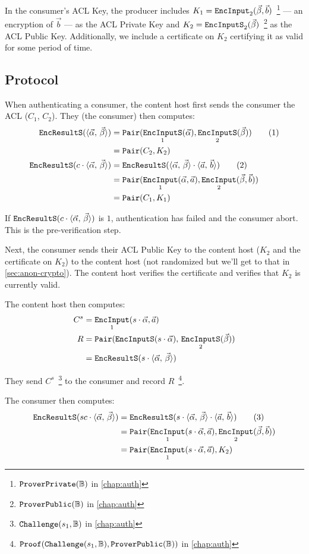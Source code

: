 \documentclass[pdftex,12pt,a4papaer,twoside,notitlepage]{report}
\newcommand{\iprod}[2]{\langle #1,\,#2\rangle}
\DeclareMathOperator{\ein}{\mathtt{EncInput}}
\DeclareMathOperator{\eins}{\mathtt{EncInputS}}
\DeclareMathOperator{\eouts}{\mathtt{EncResultS}}
\DeclareMathOperator{\pair}{\mathtt{Pair}}
\DeclareMathOperator{\Proof}{\mathtt{Proof}}
\begin{document}
In the consumer's ACL Key, the producer includes $K_1 = \ein_2(\Bp,
\vec{b})$~\footnote{$\operatorname{\mathtt{ProverPrivate}}(\mathbb{B})$ in \cref{chap:auth}} --- an encryption of $\vec{b}$ ---
as the ACL Private Key and $K_2 = \eins_2(\Bp)$~\footnote{$\operatorname{\mathtt{ProverPublic}}(\mathbb{B})$ in
  \cref{chap:auth}} as the ACL Public Key. Additionally, we include a certificate
  on $K_2$ certifying it as valid for some period of time.

\subsection{Protocol}
\label{sec:auth-crypto-proto}

When authenticating a consumer, the content host first sends the consumer the
ACL ($C_1$, $C_2$). They (the consumer) then computes:
\begin{align*}
  \eouts(\ABp)          &= \pair(\eins_1(\Ap), \eins_2(\Bp)) \tag{1} \\
                        &= \pair(C_2, K_2) \\
  \eouts(c \cdot \ABp)  &= \eouts(\ABp \cdot \iprod{\vec{a}}{\vec{b}}) \tag{2} \\
                        &= \pair(\ein_1(\Ap, \vec{a}), \ein_2(\Bp, \vec{b})) \\
                        &= \pair(C_1, K_1) \\
\end{align*}

If $\eouts(c \cdot \ABp)$ is $1$, authentication has failed and the consumer
abort. This is the pre-verification step.

Next, the consumer sends their ACL Public Key to the content host ($K_2$ and the
certificate on $K_2$) to the content host (not randomized but we'll get to that
in \cref{sec:anon-crypto}). The content host verifies the certificate and
verifies that $K_2$ is currently valid.

The content host then computes:
\begin{align*}
  C^s &= \ein_1(s\cdot\Ap, \vec{a}) \\
  R   &= \pair(\eins(s\cdot \Ap),\,\eins_2(\Bp)) \\
      &= \eouts(s\cdot \ABp)
\end{align*}


They send $C^s$~\footnote{$\operatorname{\mathtt{Challenge}}(s_1, \mathbb{B})$ in \cref{chap:auth}} to the consumer and record
$R$~\footnote{$\Proof(\Cv, \Pv)$ in \cref{chap:auth}}.

The consumer then computes:
\begin{align*}
  \eouts(sc \cdot \ABp) &= \eouts(s \cdot \ABp \cdot \iprod{\vec{a}}{\vec{b}}) \tag{3} \\
                        &= \pair(\ein_1(s \cdot \Ap, \vec{a}), \ein_2(\Bp, \vec{b})) \\
                        &= \pair(\ein_1(s \cdot \Ap, \vec{a}), K_2) \\
\end{align*}
\end{document}
